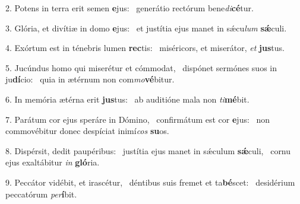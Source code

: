 2. Potens in terra erit semen \textbf{e}jus: \ast\  generátio rectórum bene\textit{di}\textbf{cé}tur.\

3. Glória, et divítiæ in domo \textbf{e}jus: \ast\  et justítia ejus manet in sǽcu\textit{lum} \textbf{sǽ}culi.\

4. Exórtum est in ténebris lumen \textbf{rec}tis: \ast\  miséricors, et miserátor, \textit{et} \textbf{jus}tus.\

5. Jucúndus homo qui miserétur et cómmodat, \dag\  dispónet sermónes suos in ju\textbf{dí}cio: \ast\  quia in ætérnum non com\textit{mo}\textbf{vé}bitur.\

6. In memória ætérna erit \textbf{jus}tus: \ast\  ab auditióne mala non \textit{ti}\textbf{mé}bit.\

7. Parátum cor ejus speráre in Dómino, \dag\  confirmátum est cor \textbf{e}jus: \ast\  non commovébitur donec despíciat inimí\textit{cos} \textbf{su}os.\

8. Dispérsit, dedit paupéribus: \dag\  justítia ejus manet in sǽculum \textbf{sǽ}culi, \ast\  cornu ejus exaltábitur \textit{in} \textbf{gló}ria.\

9. Peccátor vidébit, et irascétur, \dag\  déntibus suis fremet et ta\textbf{bé}scet: \ast\  desidérium peccatórum \textit{per}\textbf{í}bit.\

